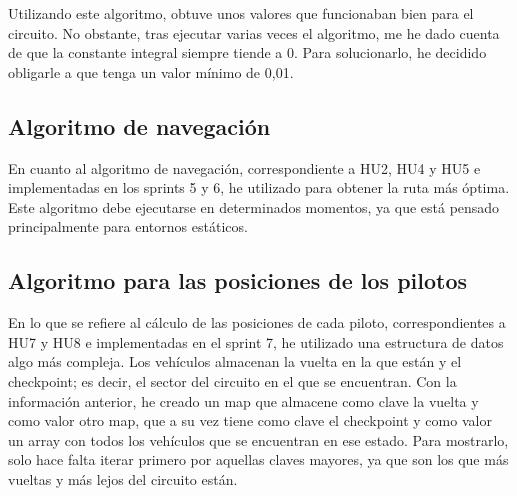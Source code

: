 Utilizando este algoritmo, obtuve unos valores que funcionaban bien para el circuito. No obstante, tras ejecutar varias veces el algoritmo, me he dado cuenta de que la constante integral siempre tiende a 0. Para solucionarlo, he decidido obligarle a que tenga un valor mínimo de 0,01.

\subsection{Algoritmo de navegación}

En cuanto al algoritmo de navegación, correspondiente a HU2, HU4 y HU5 e implementadas en los sprints 5 y 6, he utilizado \finalAlg para obtener la ruta más óptima. Este algoritmo debe ejecutarse en determinados momentos, ya que está pensado principalmente para entornos estáticos.


\subsection{Algoritmo para las posiciones de los pilotos}

En lo que se refiere al cálculo de las posiciones de cada piloto, correspondientes a HU7 y HU8 e implementadas en el sprint 7, he utilizado una estructura de datos algo más compleja. Los vehículos almacenan la vuelta en la que están y el checkpoint; es decir, el sector del circuito en el que se encuentran. Con la información anterior, he creado un map que almacene como clave la vuelta y como valor otro map, que a su vez tiene como clave el checkpoint y como valor un array con todos los vehículos que se encuentran en ese estado. Para mostrarlo, solo hace falta iterar primero por aquellas claves mayores, ya que son los que más vueltas y más lejos del circuito están.


